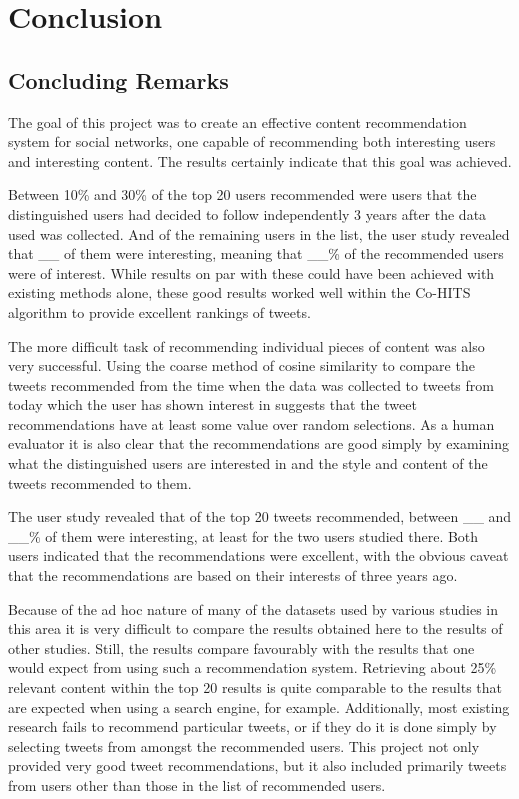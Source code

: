 \chapter{Conclusion}


\section{Concluding Remarks}

The goal of this project was to create an effective content recommendation system for social networks, one capable of recommending both interesting users and interesting content. The results certainly indicate that this goal was achieved.

Between 10\% and 30\% of the top 20 users recommended were users that the distinguished users had decided to follow independently 3 years after the data used was collected. And of the remaining users in the list, the user study revealed that \_\_ of them were interesting, meaning that \_\_\% of the recommended users were of interest. While results on par with these could have been achieved with existing methods alone, these good results worked well within the Co-HITS algorithm to provide excellent rankings of tweets.

The more difficult task of recommending individual pieces of content was also very successful. Using the coarse method of cosine similarity to compare the tweets recommended from the time when the data was collected to tweets from today which the user has shown interest in suggests that the tweet recommendations have at least some value over random selections. As a human evaluator it is also clear that the recommendations are good simply by examining what the distinguished users are interested in and the style and content of the tweets recommended to them.

The user study revealed that of the top 20 tweets recommended, between \_\_ and \_\_\% of them were interesting, at least for the two users studied there. Both users indicated that the recommendations were excellent, with the obvious caveat that the recommendations are based on their interests of three years ago.

Because of the ad hoc nature of many of the datasets used by various studies in this area it is very difficult to compare the results obtained here to the results of other studies. Still, the results compare favourably with the results that one would expect from using such a recommendation system. Retrieving about 25\% relevant content within the top 20 results is quite comparable to the results that are expected when using a search engine, for example. Additionally, most existing research fails to recommend particular tweets, or if they do it is done simply by selecting tweets from amongst the recommended users. This project not only provided very good tweet recommendations, but it also included primarily tweets from users other than those in the list of recommended users.

